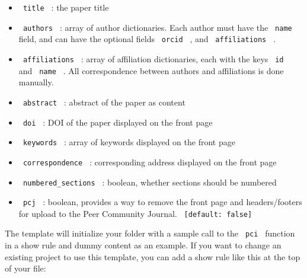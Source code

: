 \begin{itemize}
\tightlist
\item
  \texttt{\ title\ } : the paper title
\item
  \texttt{\ authors\ } : array of author dictionaries. Each author must
  have the \texttt{\ name\ } field, and can have the optional fields
  \texttt{\ orcid\ } , and \texttt{\ affiliations\ } .
\item
  \texttt{\ affiliations\ } : array of affiliation dictionaries, each
  with the keys \texttt{\ id\ } and \texttt{\ name\ } . All
  correspondence between authors and affiliations is done manually.
\item
  \texttt{\ abstract\ } : abstract of the paper as content
\item
  \texttt{\ doi\ } : DOI of the paper displayed on the front page
\item
  \texttt{\ keywords\ } : array of keywords displayed on the front page
\item
  \texttt{\ correspondence\ } : corresponding address displayed on the
  front page
\item
  \texttt{\ numbered\_sections\ } : boolean, whether sections should be
  numbered
\item
  \texttt{\ pcj\ } : boolean, provides a way to remove the front page
  and headers/footers for upload to the Peer Community Journal.
  \texttt{\ {[}default:\ false{]}\ }
\end{itemize}

The template will initialize your folder with a sample call to the
\texttt{\ pci\ } function in a show rule and dummy content as an
example. If you want to change an existing project to use this template,
you can add a show rule like this at the top of your file:

